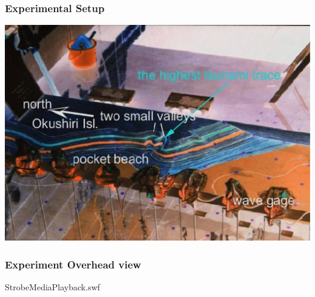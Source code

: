 \documentclass[11pt,ucs]{beamer}
\begin{document}
\begin{frame}\frametitle{Experimental Setup}


\begin{center}
\includegraphics[width=\textwidth]{experimental-setup}
\end{center}

\end{frame}




\begin{frame}\frametitle{Experiment Overhead view}


\begin{center}
   {StrobeMediaPlayback.swf}
\end{center}

\end{frame}
\end{document}
